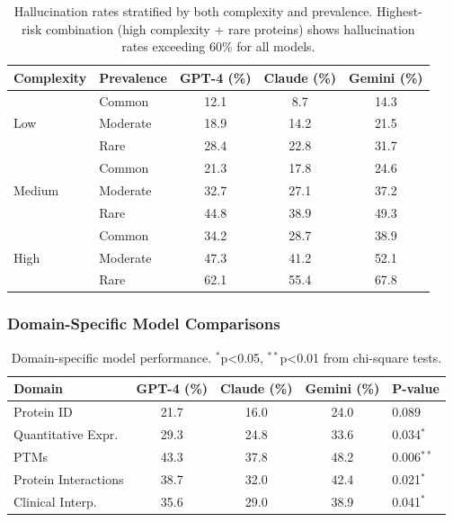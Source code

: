 \documentclass[11pt,a4paper]{article}
\begin{document}
\begin{table}[H]
\centering
\begin{tabular}{llccc}
\toprule
\textbf{Complexity} & \textbf{Prevalence} & \textbf{GPT-4 (\%)} & \textbf{Claude (\%)} & \textbf{Gemini (\%)} \\
\midrule
\multirow{3}{*}{Low} & Common & 12.1 & 8.7 & 14.3 \\
 & Moderate & 18.9 & 14.2 & 21.5 \\
 & Rare & 28.4 & 22.8 & 31.7 \\
\midrule
\multirow{3}{*}{Medium} & Common & 21.3 & 17.8 & 24.6 \\
 & Moderate & 32.7 & 27.1 & 37.2 \\
 & Rare & 44.8 & 38.9 & 49.3 \\
\midrule
\multirow{3}{*}{High} & Common & 34.2 & 28.7 & 38.9 \\
 & Moderate & 47.3 & 41.2 & 52.1 \\
 & Rare & 62.1 & 55.4 & 67.8 \\
\bottomrule
\end{tabular}
\caption{Hallucination rates stratified by both complexity and prevalence. Highest-risk combination (high complexity + rare proteins) shows hallucination rates exceeding 60\% for all models.}
\end{table}

\subsubsection{Domain-Specific Model Comparisons}

\begin{table}[H]
\centering
\begin{tabular}{lcccp{3cm}}
\toprule
\textbf{Domain} & \textbf{GPT-4 (\%)} & \textbf{Claude (\%)} & \textbf{Gemini (\%)} & \textbf{P-value} \\
\midrule
Protein ID & 21.7 & 16.0 & 24.0 & 0.089 \\
Quantitative Expr. & 29.3 & 24.8 & 33.6 & 0.034$^*$ \\
PTMs & 43.3 & 37.8 & 48.2 & 0.006$^{**}$ \\
Protein Interactions & 38.7 & 32.0 & 42.4 & 0.021$^*$ \\
Clinical Interp. & 35.6 & 29.0 & 38.9 & 0.041$^*$ \\
\bottomrule
\end{tabular}
\caption{Domain-specific model performance. $^*$p<0.05, $^{**}$p<0.01 from chi-square tests.}
\end{table}
\end{document}
